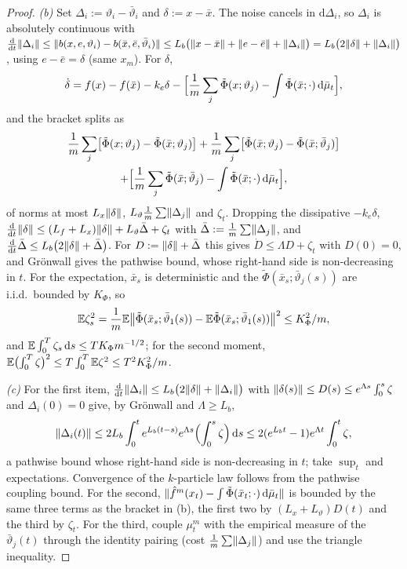 \begin{proof}
\smallskip
\textit{(b)} Set $\Delta_i := \vartheta_i - \bar\vartheta_i$ and $\delta := x - \bar x$. The noise cancels in
$\mathrm{d}\Delta_i$, so $\Delta_i$ is absolutely continuous with
$\frac{\mathrm{d}}{\mathrm{d}t}\lVert \Delta_i\rVert \le \lVert b(x,e,\vartheta_i) - b(\bar x,\bar e,\bar\vartheta_i)\rVert
\le L_b\bigl(\lVert x - \bar x\rVert + \lVert e - \bar e\rVert + \lVert \Delta_i\rVert\bigr) = L_b\bigl(2\lVert \delta\rVert + \lVert \Delta_i\rVert\bigr)$,
using $e - \bar e = \delta$ (same $x_m$). For $\delta$,
\[
  \dot\delta = f(x) - f(\bar x) - k_e\delta
  - \Bigl[\frac1m\sum_j\tilde\Phi(x;\vartheta_j) - \int\tilde\Phi(\bar x;\cdot)\,\mathrm{d}\bar\mu_t\Bigr],
\]
and the bracket splits as
\begin{multline*}
  \frac1m\sum_j\bigl[\tilde\Phi(x;\vartheta_j) - \tilde\Phi(\bar x;\vartheta_j)\bigr]
  + \frac1m\sum_j\bigl[\tilde\Phi(\bar x;\vartheta_j) - \tilde\Phi(\bar x;\bar\vartheta_j)\bigr]\\
  + \Bigl[\frac1m\sum_j\tilde\Phi(\bar x;\bar\vartheta_j) - \int\tilde\Phi(\bar x;\cdot)\,\mathrm{d}\bar\mu_t\Bigr],
\end{multline*}
of norms at most $L_x\lVert \delta\rVert$, $L_\vartheta\frac1m\sum\lVert \Delta_j\rVert$ and $\zeta_t$. Dropping the dissipative
$-k_e\delta$, $\frac{\mathrm{d}}{\mathrm{d}t}\lVert \delta\rVert \le (L_f + L_x)\lVert \delta\rVert + L_\vartheta\bar\Delta + \zeta_t$
with $\bar\Delta := \frac1m\sum\lVert \Delta_j\rVert$, and
$\frac{\mathrm{d}}{\mathrm{d}t}\bar\Delta \le L_b\bigl(2\lVert \delta\rVert + \bar\Delta\bigr)$. For
$D := \lVert \delta\rVert + \bar\Delta$ this gives $\dot D \le \Lambda D + \zeta_t$ with $D(0) = 0$, and Grönwall gives the
pathwise bound, whose right-hand side is non-decreasing in $t$. For the expectation, $\bar x_s$ is deterministic and
the $\tilde\Phi(\bar x_s;\bar\vartheta_j(s))$ are i.i.d.\ bounded by $K_\Phi$, so
\[
  \mathbb{E}\zeta_s^2 = \frac1m\mathbb{E}\bigl\lVert\tilde\Phi(\bar x_s;\bar\vartheta_1(s))
  - \mathbb{E}\tilde\Phi(\bar x_s;\bar\vartheta_1(s))\bigr\rVert^2 \le K_\Phi^2/m,
\]
and $\mathbb{E}\int_0^T\zeta_s\,\mathrm{d} s \le TK_\Phi m^{-1/2}$; for the second moment,
$\mathbb{E}\bigl(\int_0^T\zeta\bigr)^2 \le T\int_0^T\mathbb{E}\zeta^2 \le T^2K_\Phi^2/m$.

\smallskip
\textit{(c)} For the first item, $\frac{\mathrm{d}}{\mathrm{d}t}\lVert \Delta_i\rVert \le L_b\bigl(2\lVert \delta\rVert + \lVert \Delta_i\rVert\bigr)$
with $\lVert \delta(s)\rVert \le D(s) \le e^{\Lambda s}\int_0^s\zeta$ and $\Delta_i(0) = 0$ give, by Grönwall and
$\Lambda\ge L_b$,
\[
  \lVert \Delta_i(t)\rVert \le 2L_b\int_0^te^{L_b(t-s)}e^{\Lambda s}\Bigl(\int_0^s\zeta\Bigr)\,\mathrm{d} s
  \le 2(e^{L_bt} - 1)e^{\Lambda t}\int_0^t\zeta,
\]
a pathwise bound whose right-hand side is non-decreasing in $t$; take $\sup_t$ and expectations. Convergence of the
$k$-particle law follows from the pathwise coupling bound. For the second,
$\lVert \hat f^m(x_t) - \int\tilde\Phi(\bar x_t;\cdot)\,\mathrm{d}\bar\mu_t\rVert$ is bounded by the same three terms as the bracket
in (b), the first two by $(L_x + L_\vartheta)D(t)$ and the third by $\zeta_t$. For the third, couple $\mu^m_t$ with
the empirical measure of the $\bar\vartheta_j(t)$ through the identity pairing (cost $\frac1m\sum\lVert \Delta_j\rVert$) and
use the triangle inequality.


\end{proof}
